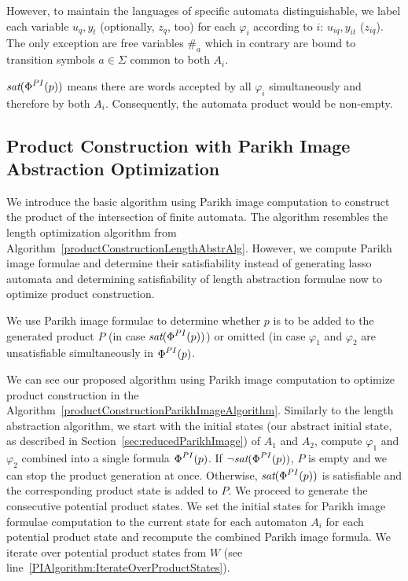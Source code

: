 However, to maintain the languages of specific automata distinguishable, we label each variable $u_q, y_t$ (optionally, $z_q$, too) for each $\varphi_i$ according to $i$: $u_{iq}, y_{it}$ ($z_{iq}$). The only exception are free variables $\#_a$ which in contrary are bound to transition symbols $a \in \Sigma$ common to both $A_i$.

$\emph{sat}(\emph{$\Phi$}^{PI}(p))$ means there are words accepted by all $\varphi_i$ simultaneously and therefore by both $A_i$. Consequently, the automata product would be non-empty.

\subsection{Product Construction with Parikh Image Abstraction Optimization}

We introduce the basic algorithm using Parikh image computation to construct the product of the intersection of finite automata. The algorithm resembles the length optimization algorithm from Algorithm~\ref{productConstructionLengthAbstrAlg}. However, we compute Parikh image formulae and determine their satisfiability instead of generating lasso automata and determining satisfiability of length abstraction formulae now to optimize product construction.

We use Parikh image formulae to determine whether $p$ is to be added to the generated product $P$ (in case $\emph{sat}(\emph{$\Phi$}^{PI}(p))$) or omitted (in case $\varphi_1$ and $\varphi_2$ are unsatisfiable simultaneously in $\emph{$\Phi$}^{PI}(p)$.

We can see our proposed algorithm using Parikh image computation to optimize product construction in the Algorithm~\ref{productConstructionParikhImageAlgorithm}. Similarly to the length abstraction algorithm, we start with the initial states (our abstract initial state, as described in Section~\ref{sec:reducedParikhImage}) of $A_1$ and $A_2$, compute $\varphi_1$ and $\varphi_2$ combined into a single formula $\emph{$\Phi$}^{PI}(p)$. If $\neg \emph{sat}(\emph{$\Phi$}^{PI}(p))$, $P$ is empty and we can stop the product generation at once. Otherwise, $\emph{sat}(\emph{$\Phi$}^{PI}(p))$ is satisfiable and the corresponding product state is added to $P$. We proceed to generate the consecutive potential product states. We set the initial states for Parikh image formulae computation to the current state for each automaton $A_i$ for each potential product state and recompute the combined Parikh image formula. We iterate over potential product states from $W$ (see line~\ref{PIAlgorithm:IterateOverProductStates}).

